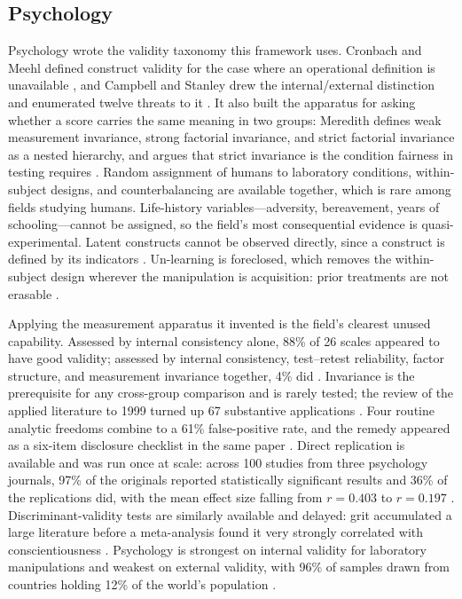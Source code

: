 \documentclass{article}
\begin{document}
\subsection{Psychology}

Psychology wrote the validity taxonomy this framework uses. Cronbach and Meehl defined construct validity for the case where an operational definition is unavailable \citep{cronbach1955construct}, and Campbell and Stanley drew the internal/external distinction and enumerated twelve threats to it \citep{campbell1963experimental}. It also built the apparatus for asking whether a score carries the same meaning in two groups: Meredith defines weak measurement invariance, strong factorial invariance, and strict factorial invariance as a nested hierarchy, and argues that strict invariance is the condition fairness in testing requires \citep{meredith1993measurement}. Random assignment of humans to laboratory conditions, within-subject designs, and counterbalancing are available together, which is rare among fields studying humans. Life-history variables---adversity, bereavement, years of schooling---cannot be assigned, so the field's most consequential evidence is quasi-experimental. Latent constructs cannot be observed directly, since a construct is defined by its indicators \citep{hussey2020hidden}. Un-learning is foreclosed, which removes the within-subject design wherever the manipulation is acquisition: prior treatments are not erasable \citep{campbell1963experimental}.

Applying the measurement apparatus it invented is the field's clearest unused capability. Assessed by internal consistency alone, 88\% of 26 scales appeared to have good validity; assessed by internal consistency, test--retest reliability, factor structure, and measurement invariance together, 4\% did \citep{hussey2020hidden}. Invariance is the prerequisite for any cross-group comparison and is rarely tested; the review of the applied literature to 1999 turned up 67 substantive applications \citep{vandenberg2000review}. Four routine analytic freedoms combine to a 61\% false-positive rate, and the remedy appeared as a six-item disclosure checklist in the same paper \citep{simmons2011false}. Direct replication is available and was run once at scale: across 100 studies from three psychology journals, 97\% of the originals reported statistically significant results and 36\% of the replications did, with the mean effect size falling from $r = 0.403$ to $r = 0.197$ \citep{osc2015estimating}. Discriminant-validity tests are similarly available and delayed: grit accumulated a large literature before a meta-analysis found it very strongly correlated with conscientiousness \citep{crede2017much}. Psychology is strongest on internal validity for laboratory manipulations and weakest on external validity, with 96\% of samples drawn from countries holding 12\% of the world's population \citep{henrich2010weirdest}.
\end{document}
